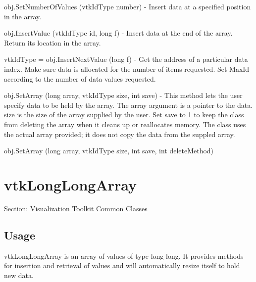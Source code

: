 \begin{DoxyItemize}
\item {\ttfamily obj.\-Set\-Number\-Of\-Values (vtk\-Id\-Type number)} -\/ Insert data at a specified position in the array.  
\item {\ttfamily obj.\-Insert\-Value (vtk\-Id\-Type id, long f)} -\/ Insert data at the end of the array. Return its location in the array.  
\item {\ttfamily vtk\-Id\-Type = obj.\-Insert\-Next\-Value (long f)} -\/ Get the address of a particular data index. Make sure data is allocated for the number of items requested. Set Max\-Id according to the number of data values requested.  
\item {\ttfamily obj.\-Set\-Array (long array, vtk\-Id\-Type size, int save)} -\/ This method lets the user specify data to be held by the array. The array argument is a pointer to the data. size is the size of the array supplied by the user. Set save to 1 to keep the class from deleting the array when it cleans up or reallocates memory. The class uses the actual array provided; it does not copy the data from the suppled array.  
\item {\ttfamily obj.\-Set\-Array (long array, vtk\-Id\-Type size, int save, int delete\-Method)}  
\end{DoxyItemize}\hypertarget{vtkcommon_vtklonglongarray}{}\section{vtk\-Long\-Long\-Array}\label{vtkcommon_vtklonglongarray}
Section\-: \hyperlink{sec_vtkcommon}{Visualization Toolkit Common Classes} \hypertarget{vtkwidgets_vtkxyplotwidget_Usage}{}\subsection{Usage}\label{vtkwidgets_vtkxyplotwidget_Usage}
vtk\-Long\-Long\-Array is an array of values of type long long. It provides methods for insertion and retrieval of values and will automatically resize itself to hold new data.

